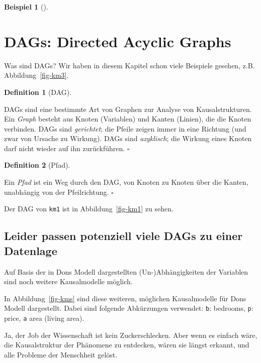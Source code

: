 \documentclass[
  ngerman,
  letterpaper,
  twoside,
  open=any]{scrbook}
\theoremstyle{definition}
\newtheorem{example}{Beispiel}[chapter]
\theoremstyle{plain}
\theoremstyle{definition}
\theoremstyle{definition}
\newtheorem{definition}{Definition}[chapter]
\theoremstyle{remark}
\begin{document}
\begin{example}[]
\section{DAGs: Directed Acyclic
Graphs}\label{dags-directed-acyclic-graphs}

Was sind DAGs? Wir haben in diesem Kapitel schon viele Beispiele
gesehen, z.B. Abbildung~\ref{fig-km3}.

\begin{definition}[DAG]\protect\hypertarget{def-dag}{}\label{def-dag}

DAGs sind eine bestimmte Art von Graphen zur Analyse von
Kausalstrukturen. Ein \emph{Graph} besteht aus Knoten (Variablen) und
Kanten (Linien), die die Knoten verbinden. DAGs sind \emph{gerichtet};
die Pfeile zeigen immer in eine Richtung (und zwar von Ursache zu
Wirkung). DAGs sind \emph{azyklisch}; die Wirkung eines Knoten darf
nicht wieder auf ihn zurückführen. \(\square\)

\end{definition}

\begin{definition}[Pfad]\protect\hypertarget{def-pfad}{}\label{def-pfad}

Ein \emph{Pfad} ist ein Weg durch den DAG, von Knoten zu Knoten über die
Kanten, unabhängig von der Pfeilrichtung. \(\square\)

\end{definition}

Der DAG von \texttt{km1} ist in Abbildung~\ref{fig-km1} zu sehen.

\subsection{Leider passen potenziell viele DAGs zu einer
Datenlage}\label{leider-passen-potenziell-viele-dags-zu-einer-datenlage}

Auf Basis der in Dons Modell dargestellten (Un-)Abhängigkeiten der
Variablen sind noch weitere Kausalmodelle möglich.

In Abbildung~\ref{fig-kms} sind diese weiteren, möglichen Kausalmodelle
für Dons Modell dargestellt. Dabei sind folgende Abkürzungen verwendet:
\texttt{b}: bedrooms, \texttt{p}: price, \texttt{a} area (living area).

Ja, der Job der Wissenschaft ist kein Zuckerschlecken. Aber wenn es
einfach wäre, die Kausalstruktur der Phänomene zu entdecken, wären sie
längst erkannt, und alle Probleme der Menschheit gelöst.


\end{example}
\end{document}
